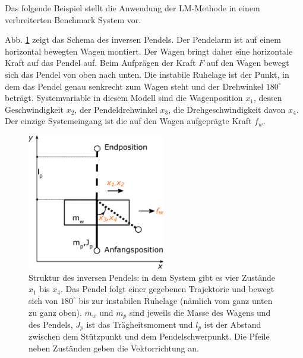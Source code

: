 Das folgende Beispiel stellt die Anwendung der LM-Methode in einem verbreiterten Benchmark System vor.

\begin{beispiel}
	Abb. \ref{fig:Inverses-Pendel} zeigt das Schema des inversen Pendels. Der Pendelarm ist auf einem horizontal bewegten Wagen montiert. Der Wagen bringt daher eine horizontale Kraft auf das Pendel auf. Beim Aufprägen der Kraft ${F}$ auf den Wagen bewegt sich das Pendel von oben nach unten. Die instabile Ruhelage ist der Punkt, in dem das Pendel genau senkrecht zum Wagen steht und der Drehwinkel $180^{\circ}$ beträgt. Systemvariable in diesem Modell sind die Wagenposition ${x}_{1}$, dessen Geschwindigkeit ${x}_{2}$, der Pendeldrehwinkel ${x}_{3}$, die Drehgeschwindigkeit davon ${x}_{4}$. Der einzige Systemeingang ist die auf den Wagen aufgeprägte Kraft $f_{w}$.
	\begin{figure}
		\centering
		\includegraphics[width=6cm]{bild/modul/Inverses-Pendel.eps}
		\caption{Struktur des inversen Pendels: in dem System gibt es vier Zustände ${x}_{1}$ bis ${x}_{4}$. Das Pendel folgt einer gegebenen Trajektorie und bewegt sich von $180^{\circ}$ bis zur instabilen Ruhelage (nämlich vom ganz unten zu ganz oben). $m_{w}$ und $m_{p}$ sind jeweils die Masse des Wagens und des Pendels, $J_{p}$ ist das Trägheitsmoment und $l_{p}$ ist der Abstand zwischen dem Stützpunkt und dem Pendelschwerpunkt. Die Pfeile neben Zuständen geben die Vektorrichtung an.}
		\label{fig:Inverses-Pendel}
	\end{figure}  


\end{beispiel}
